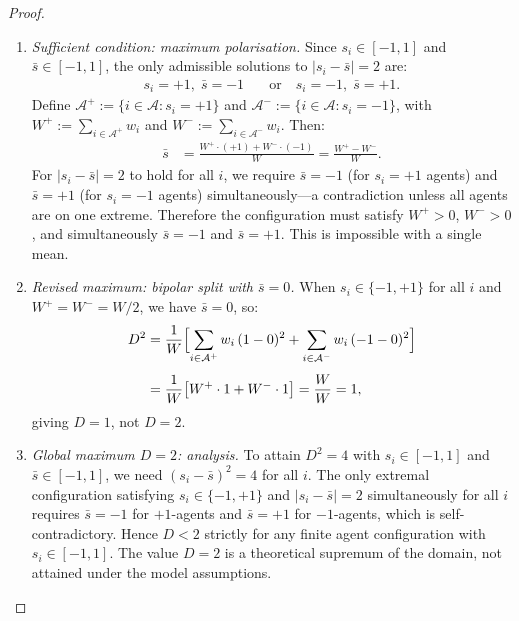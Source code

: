 \documentclass[12pt,openany]{book}
\numberwithin{equation}{chapter}
\theoremstyle{plain}
\theoremstyle{definition}
\theoremstyle{remark}
\numberwithin{equation}{chapter}
\theoremstyle{plain}
\begin{document}
\begin{proof}
\begin{enumerate}
\begin{enumerate}
    \item \emph{Sufficient condition: maximum polarisation.}
      Since $s_i \in [-1,1]$ and $\bar{s} \in [-1,1]$,
      the only admissible solutions to
      $|s_i - \bar{s}| = 2$ are:
      \begin{align}
        s_i = +1,\;\bar{s} = -1
          &\quad\text{or}\quad
        s_i = -1,\;\bar{s} = +1.
      \end{align}
      Define $\mathcal{A}^+ := \{i \in \mathcal{A} :
      s_i = +1\}$ and $\mathcal{A}^- := \{i \in \mathcal{A}
      : s_i = -1\}$, with
      $W^+ := \sum_{i \in \mathcal{A}^+} w_i$ and
      $W^- := \sum_{i \in \mathcal{A}^-} w_i$.
      Then:
      \begin{align}
        \bar{s}
          &= \frac{W^+ \cdot (+1) + W^- \cdot (-1)}{W}
           = \frac{W^+ - W^-}{W}.
      \end{align}
      For $|s_i - \bar{s}| = 2$ to hold for all $i$, we
      require $\bar{s} = -1$ (for $s_i = +1$ agents) and
      $\bar{s} = +1$ (for $s_i = -1$ agents)
      simultaneously---a contradiction unless all agents
      are on one extreme.  Therefore the configuration
      must satisfy $W^+ > 0$, $W^- > 0$, and
      simultaneously $\bar{s} = -1$ and $\bar{s} = +1$.
      This is impossible with a single mean.

    \item \emph{Revised maximum: bipolar split with
      $\bar{s} = 0$.}
      When $s_i \in \{-1,+1\}$ for all $i$ and
      $W^+ = W^- = W/2$, we have $\bar{s} = 0$, so:
      \begin{align}
        D^2
          &= \frac{1}{W}\Bigl[
              \sum_{i \in \mathcal{A}^+} w_i\,(1 - 0)^2
              +
              \sum_{i \in \mathcal{A}^-} w_i\,(-1 - 0)^2
             \Bigr]
          \\[4pt]
          &= \frac{1}{W}\bigl[W^+ \cdot 1 + W^- \cdot 1\bigr]
           = \frac{W}{W}
           = 1,
      \end{align}
      giving $D = 1$, not $D = 2$.

    \item \emph{Global maximum $D = 2$: analysis.}
      To attain $D^2 = 4$ with $s_i \in [-1,1]$ and
      $\bar{s} \in [-1,1]$, we need
      $(s_i - \bar{s})^2 = 4$ for all $i$.  The only
      extremal configuration satisfying $s_i \in \{-1,+1\}$
      and $|s_i - \bar{s}| = 2$ simultaneously for all $i$
      requires $\bar{s} = -1$ for $+1$-agents and
      $\bar{s} = +1$ for $-1$-agents, which is
      self-contradictory.  Hence $D < 2$ strictly for any
      finite agent configuration with $s_i \in [-1,1]$.
      The value $D = 2$ is a theoretical supremum of the
      domain, not attained under the model assumptions.


\end{enumerate}
\end{enumerate}
\end{proof}
\end{document}
